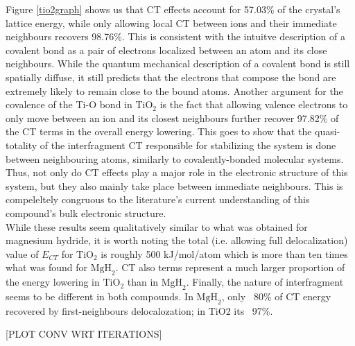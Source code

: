 \documentclass[aps,prb,twocolumn,amsmath,amssymb,superscriptaddress,longbibliography]{revtex4-1}
\newcommand{\N}{\mathbb{N}}
\newcommand{\C}{\mathbb{C}}
\begin{document}
Figure \ref{tio2graph} shows us that CT effects account for 57.03\% of the crystal's lattice energy, while only allowing local CT between ions and their immediate neighbours recovers 98.76\%.
This is consistent with the intuitve description of a covalent bond as a pair of electrons localized between an atom and its close neighbours. While the quantum mechanical description of a covalent bond is still spatially diffuse, it still predicts that the electrons that compose the bond are extremely likely to remain close to the bound atoms.
Another argument for the covalence of the Ti-O bond in $\text{TiO}_{2}$ is the fact that allowing valence electrons to only move between an ion and its closest neighbours further recover 97.82\% of the CT terms in the overall energy lowering. 
This goes to show that the quasi-totality of the interfragment CT responsible for stabilizing the system is done between neighbouring atoms, similarly to covalently-bonded molecular systems. 
Thus, not only do CT effects play a major role in the electronic structure of this system, but they also mainly take place between immediate neighbours. 
This is compeleltely congruous to the literature's current understanding of this compound's bulk electronic structure.\\

While these results seem qualitatively similar to what was obtained for magnesium hydride, it is worth noting the total (i.e. allowing full delocalization) value of $E_{CT}$ for $\text{TiO}_{2}$ is roughly 500 kJ/mol/atom which is more than ten times what was found for $\text{MgH}_{2}$.
CT also terms represent a much larger proportion of the energy lowering in $\text{TiO}_{2}$ than in $\text{MgH}_{2}$.
Finally, the nature of interfragment seems to be different in both compounds. In $\text{MgH}_{2}$, only ~80\% of CT energy recovered by first-neighbours delocalozation; in TiO2 its ~97\%.

  





[PLOT CONV WRT ITERATIONS]

\end{document}
